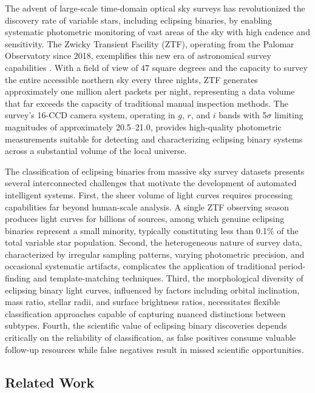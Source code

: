 \documentclass[11pt,a4paper]{article}
\begin{document}
The advent of large-scale time-domain optical sky surveys has revolutionized the discovery rate of variable stars, including eclipsing binaries, by enabling systematic photometric monitoring of vast areas of the sky with high cadence and sensitivity. The Zwicky Transient Facility (ZTF), operating from the Palomar Observatory since 2018, exemplifies this new era of astronomical survey capabilities \citep{bellm2019zwicky}. With a field of view of 47 square degrees and the capacity to survey the entire accessible northern sky every three nights, ZTF generates approximately one million alert packets per night, representing a data volume that far exceeds the capacity of traditional manual inspection methods. The survey's 16-CCD camera system, operating in $g$, $r$, and $i$ bands with 5$\sigma$ limiting magnitudes of approximately 20.5--21.0, provides high-quality photometric measurements suitable for detecting and characterizing eclipsing binary systems across a substantial volume of the local universe.

The classification of eclipsing binaries from massive sky survey datasets presents several interconnected challenges that motivate the development of automated intelligent systems. First, the sheer volume of light curves requires processing capabilities far beyond human-scale analysis. A single ZTF observing season produces light curves for billions of sources, among which genuine eclipsing binaries represent a small minority, typically constituting less than 0.1\% of the total variable star population. Second, the heterogeneous nature of survey data, characterized by irregular sampling patterns, varying photometric precision, and occasional systematic artifacts, complicates the application of traditional period-finding and template-matching techniques. Third, the morphological diversity of eclipsing binary light curves, influenced by factors including orbital inclination, mass ratio, stellar radii, and surface brightness ratios, necessitates flexible classification approaches capable of capturing nuanced distinctions between subtypes. Fourth, the scientific value of eclipsing binary discoveries depends critically on the reliability of classification, as false positives consume valuable follow-up resources while false negatives result in missed scientific opportunities.

\subsection{Related Work}
\end{document}

